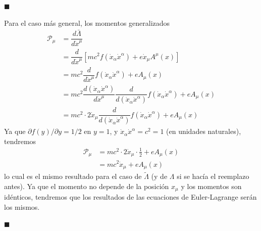 \documentclass[]{article}
\numberwithin{equation}{section}
\newcommand{\0}{\textcolor{gray}{0}}
\newcommand{\lpd}[2]{\partial #1/\partial #2}
\newcommand{\td}[2]{\dfrac{d #1}{d #2}}
\newcommand{\qed}{\hfill\(\blacksquare\)}
\begin{document}
\begin{enumerate}
	\qed
	
	Para el caso más general, los momentos generalizados
		\begin{align*}
		\mathcal{P}_\mu &= \td{\bar{\Lambda}}{\dot{x}^\mu}\\
		&= \td{}{\dot{x}^\mu} \left[m c^2 f(\dot{x}_\alpha \dot{x}^\alpha) + e \dot{x}_\mu A^\mu (x) \right]\\
		&= m c^2 \td{}{\dot{x}^\mu} f(\dot{x}_\alpha \dot{x}^\alpha) + e A_\mu (x)\\
		&= m c^2 \td{\left(\dot{x}_\alpha \dot{x}^\alpha\right)}{\dot{x}^\mu} \td{}{\left(\dot{x}_\alpha \dot{x}^\alpha\right)} f(\dot{x}_\alpha \dot{x}^\alpha) + e A_\mu (x)\\
		&= m c^2 \cdot 2\dot{x}_\mu \td{}{\left(\dot{x}_\alpha \dot{x}^\alpha\right)} f(\dot{x}_\alpha \dot{x}^\alpha) + e A_\mu (x)
	\end{align*}
	Ya que $\lpd{f(y)}{y} = 1/2$ en $y = 1$, y $\dot{x}_\alpha \dot{x}^\alpha = c^2 = 1$ (en unidades naturales), tendremos
	\begin{align*}
		\mathcal{P}_\mu &= m c^2 \cdot 2\dot{x}_\mu \cdot \frac{1}{2} + e A_\mu (x)\\
		&= m c^2 \dot{x}_\mu + e A_\mu (x)
	\end{align*}
	lo cual es el mismo resultado para el caso de $\tilde{\Lambda}$ (y de $\Lambda$ si se hacía el reemplazo antes). Ya que el momento no depende de la posición $x_\mu$ y los momentos son idénticos, tendremos que los resultados de las ecuaciones de Euler-Lagrange serán los mismos.
	
	\qed
	

\end{enumerate}
\end{document}
